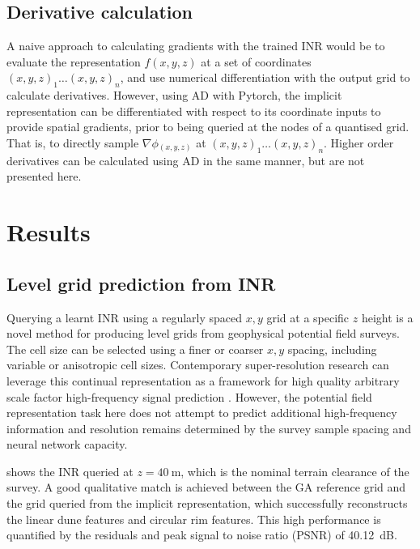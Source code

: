 \subsection{Derivative calculation}
A naive approach to calculating gradients with the trained INR would be to evaluate the representation \(f(x, y, z)\) at a set of coordinates \({(x, y, z)}_1 \dots {(x,y,z)}_n\), and use numerical differentiation with the output grid to calculate derivatives.
However, using AD with Pytorch, the implicit representation can be differentiated with respect to its coordinate inputs to provide spatial gradients, prior to being queried at the nodes of a quantised grid.
That is, to directly sample \(\nabla{}\phi{}_{(x,y,z)}\) at \({(x, y, z)}_1 \dots {(x,y,z)}_n\).
Higher order derivatives can be calculated using AD in the same manner, but are not presented here.

\section{Results}
\subsection{Level grid prediction from INR}
Querying a learnt INR using a regularly spaced \(x,y\) grid at a specific \(z\) height is a novel method for producing level grids from geophysical potential field surveys.
The cell size can be selected using a finer or coarser \(x,y\) spacing, including variable or anisotropic cell sizes.
Contemporary super-resolution research can leverage this continual representation as a framework for high quality arbitrary scale factor high-frequency signal prediction \parencite[e.g][]{chenLearningContinuousImage2021}.
However, the potential field representation task here does not attempt to predict additional high-frequency information and resolution remains determined by the survey sample spacing and neural network capacity.

 shows the INR queried at \(z=\qty{40}{\m}\), which is the nominal terrain clearance of the survey.
A good qualitative match is achieved between the GA reference grid and the grid queried from the implicit representation, which successfully reconstructs the linear dune features and circular rim features.
This high performance is quantified by the residuals and peak signal to noise ratio (PSNR) of \qty{40.12}{\dB}.

